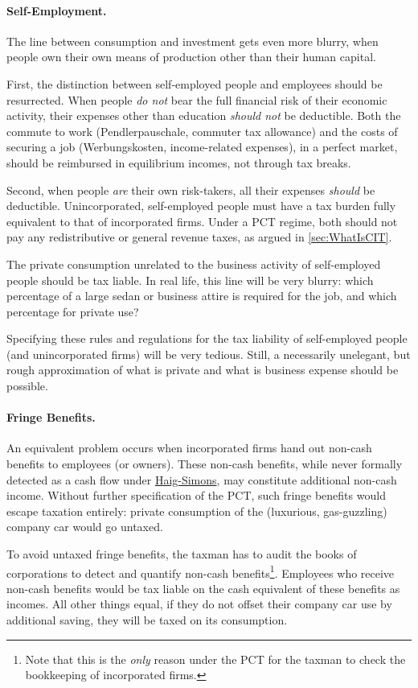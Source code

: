 \paragraph{Self-Employment.} The line between consumption and investment gets even more blurry, when people own their own means of production other than their human capital. 

First, the distinction between self-employed people and employees should be resurrected. When people \emph{do not} bear the full financial risk of their economic activity, their expenses other than education \emph{should not} be deductible. Both the commute to work (Pendlerpauschale, commuter tax allowance) and the costs of securing a job (Werbungskosten, income-related expenses), in a perfect market, should be reimbursed in equilibrium incomes, not through tax breaks.

Second, when people \emph{are} their own risk-takers, all their expenses \emph{should} be deductible. Unincorporated, self-employed people must have a tax burden fully equivalent to that of incorporated firms. Under a PCT regime, both should not pay any redistributive or general revenue taxes, as argued in \autoref{sec:WhatIsCIT}. 

The private consumption unrelated to the business activity of self-employed people should be tax liable. In real life, this line will be very blurry: which percentage of a large sedan or business attire is required for the job, and which percentage for private use?

Specifying these rules and regulations for the tax liability of self-employed people (and unincorporated firms) will be very tedious. Still, a necessarily unelegant, but rough approximation of what is private and what is business expense should be possible.

\paragraph{Fringe Benefits.} An equivalent problem occurs when incorporated firms hand out non-cash benefits to employees (or owners). These non-cash benefits, while never formally detected as a cash flow under \hyperref[eq:HaigSimonsPCT]{Haig-Simons}, may constitute additional non-cash income. Without further specification of the PCT, such fringe benefits would escape taxation entirely: private consumption of the (luxurious, gas-guzzling) company car would go untaxed.

To avoid untaxed fringe benefits, the taxman has to audit the books of corporations to detect and quantify non-cash benefits\footnote{
	Note that this is the \emph{only} reason under the PCT for the taxman to check the bookkeeping of incorporated firms.}. 
Employees who receive non-cash benefits would be tax liable on the cash equivalent of these benefits as incomes. All other things equal, if they do not offset their company car use by additional saving, they will be taxed on its consumption.

